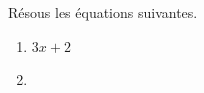 \documentclass[parskip=half-]{scrartcl}
\begin{document}
Résous les équations suivantes.
 \begin{enumerate}[label=\emph{\alph*})]
    \item $3x+2$
    \item 
 \end{enumerate}
\end{document}
